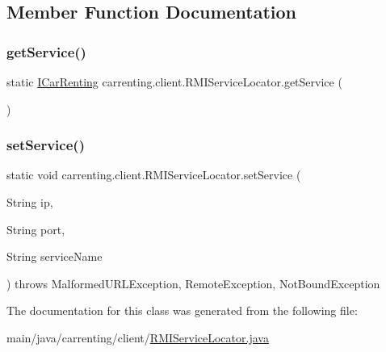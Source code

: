 \subsection{Member Function Documentation}
\mbox{\label{classcarrenting_1_1client_1_1_r_m_i_service_locator_a0ac0c6fa2786c97632c927749a53237c}} 
\subsubsection{\texorpdfstring{getService()}{getService()}}
{\footnotesize\ttfamily static \mbox{\hyperlink{interfacecarrenting_1_1server_1_1_i_car_renting}{I\+Car\+Renting}} carrenting.\+client.\+R\+M\+I\+Service\+Locator.\+get\+Service (\begin{DoxyParamCaption}{ }\end{DoxyParamCaption})\hspace{0.3cm}{\ttfamily [static]}}

\mbox{\label{classcarrenting_1_1client_1_1_r_m_i_service_locator_a334261a803c2de0ef14d82c998a39e85}} 
\subsubsection{\texorpdfstring{setService()}{setService()}}
{\footnotesize\ttfamily static void carrenting.\+client.\+R\+M\+I\+Service\+Locator.\+set\+Service (\begin{DoxyParamCaption}\item[{String}]{ip,  }\item[{String}]{port,  }\item[{String}]{service\+Name }\end{DoxyParamCaption}) throws Malformed\+U\+R\+L\+Exception, Remote\+Exception, Not\+Bound\+Exception\hspace{0.3cm}{\ttfamily [static]}}



The documentation for this class was generated from the following file\+:\begin{DoxyCompactItemize}
\item 
main/java/carrenting/client/\mbox{\hyperlink{_r_m_i_service_locator_8java}{R\+M\+I\+Service\+Locator.\+java}}\end{DoxyCompactItemize}
